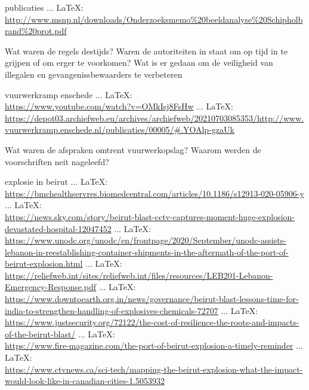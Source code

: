 \begin{thebibliography}{99}
{{{	
	
	publicaties
	 ... \LaTeX:\\ \url{http://www.msnp.nl/downloads/Onderzoeksmemo%20beeldanalyse%20Schipholbrand%20prot.pdf}
	 
	Wat waren de regels destijds?
	Waren de autoriteiten in staat om op tijd in te grijpen of om erger te voorkomen?
	Wat is er gedaan om de veiligheid van illegalen en gevangenissbewaarders te verbeteren
	
	
	
	vuurwerkramp enschede
	 ... \LaTeX:\\ \url{https://www.youtube.com/watch?v=OMkIsj8FsHw}
	 ... \LaTeX:\\ \url{https://depot03.archiefweb.eu/archives/archiefweb/20210703085353/http://www.vuurwerkramp.enschede.nl/publicaties/00005/#.YOAlp-gzaUk}
	
	Wat waren de afspraken omtrent vuurwerkopslag?
	Waarom werden de voorschriften neit nageleefd?
	
	
	
	
	explosie in beirut
	 ... \LaTeX:\\ \url{https://bmchealthservres.biomedcentral.com/articles/10.1186/s12913-020-05906-y}
	 ... \LaTeX:\\ \url{https://news.sky.com/story/beirut-blast-cctv-captures-moment-huge-explosion-devastated-hospital-12047452}
	 ... \LaTeX:\\ \url{https://www.unodc.org/unodc/en/frontpage/2020/September/unodc-assists-lebanon-in-reestablishing-container-shipments-in-the-aftermath-of-the-port-of-beirut-explosion.html}
	 ... \LaTeX:\\ \url{https://reliefweb.int/sites/reliefweb.int/files/resources/LEB201-Lebanon-Emergency-Response.pdf}
	 ... \LaTeX:\\ \url{https://www.downtoearth.org.in/news/governance/beirut-blast-lessons-time-for-india-to-strengthen-handling-of-explosives-chemicals-72707}
	 ... \LaTeX:\\ \url{https://www.justsecurity.org/72122/the-cost-of-resilience-the-roots-and-impacts-of-the-beirut-blast/}
	 ... \LaTeX:\\ \url{https://www.fire-magazine.com/the-port-of-beirut-explosion-a-timely-reminder}
	 ... \LaTeX:\\ \url{https://www.ctvnews.ca/sci-tech/mapping-the-beirut-explosion-what-the-impact-would-look-like-in-canadian-cities-1.5053932}
	
}}}
\end{thebibliography}
